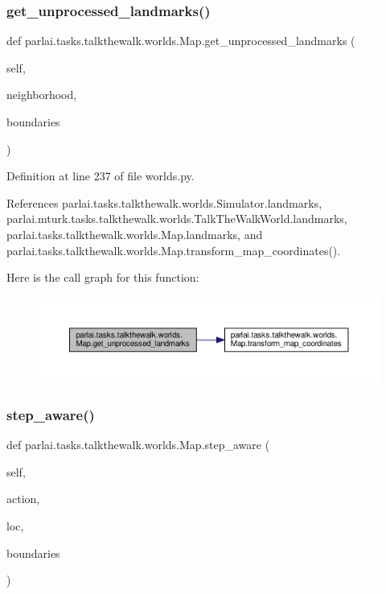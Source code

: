 \subsubsection{\texorpdfstring{get\+\_\+unprocessed\+\_\+landmarks()}{get\_unprocessed\_landmarks()}}
{\footnotesize\ttfamily def parlai.\+tasks.\+talkthewalk.\+worlds.\+Map.\+get\+\_\+unprocessed\+\_\+landmarks (\begin{DoxyParamCaption}\item[{}]{self,  }\item[{}]{neighborhood,  }\item[{}]{boundaries }\end{DoxyParamCaption})}



Definition at line 237 of file worlds.\+py.



References parlai.\+tasks.\+talkthewalk.\+worlds.\+Simulator.\+landmarks, parlai.\+mturk.\+tasks.\+talkthewalk.\+worlds.\+Talk\+The\+Walk\+World.\+landmarks, parlai.\+tasks.\+talkthewalk.\+worlds.\+Map.\+landmarks, and parlai.\+tasks.\+talkthewalk.\+worlds.\+Map.\+transform\+\_\+map\+\_\+coordinates().

Here is the call graph for this function\+:
\nopagebreak
\begin{figure}[H]
\begin{center}
\leavevmode
\includegraphics[width=350pt]{classparlai_1_1tasks_1_1talkthewalk_1_1worlds_1_1Map_adc7aa565cd5b7e90f6741e1b90632b92_cgraph}
\end{center}
\end{figure}
\mbox{\label{classparlai_1_1tasks_1_1talkthewalk_1_1worlds_1_1Map_a3c59a7fa515ceefb772da1f807021b85}} 
\subsubsection{\texorpdfstring{step\+\_\+aware()}{step\_aware()}}
{\footnotesize\ttfamily def parlai.\+tasks.\+talkthewalk.\+worlds.\+Map.\+step\+\_\+aware (\begin{DoxyParamCaption}\item[{}]{self,  }\item[{}]{action,  }\item[{}]{loc,  }\item[{}]{boundaries }\end{DoxyParamCaption})}



